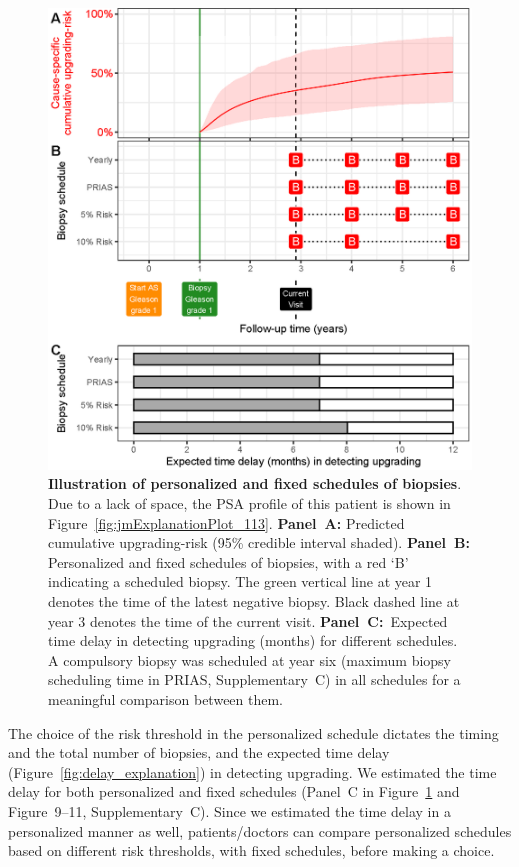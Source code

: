 \begin{figure}
\centerline{\includegraphics[width=\columnwidth]{images/demo_pat1.eps}}
\caption{\textbf{Illustration of personalized and fixed schedules of biopsies}. Due to a lack of space, the PSA profile of this patient is shown in Figure~\ref{fig:jmExplanationPlot_113}. \textbf{Panel~A:} Predicted cumulative upgrading-risk (95\% credible interval shaded). \textbf{Panel~B:} Personalized and fixed schedules of biopsies, with a red `B' indicating a scheduled biopsy. The green vertical line at year 1 denotes the time of the latest negative biopsy. Black dashed line at year 3 denotes the time of the current visit. \textbf{Panel~C:}\ Expected time delay in detecting upgrading (months) for different schedules. A compulsory biopsy was scheduled at year six (maximum biopsy scheduling time in PRIAS, Supplementary~C) in all schedules for a meaningful comparison between them.}
\label{fig:demo_pat1}
\end{figure}

The choice of the risk threshold in the personalized schedule dictates the timing and the total number of biopsies, and the expected time delay (Figure~\ref{fig:delay_explanation}) in detecting upgrading. We estimated the time delay for both personalized and fixed schedules (Panel~C in Figure~\ref{fig:demo_pat1} and Figure~9--11, Supplementary~C). Since we estimated the time delay in a personalized manner as well, patients/doctors can compare personalized schedules based on different risk thresholds, with fixed schedules, before making a choice.

